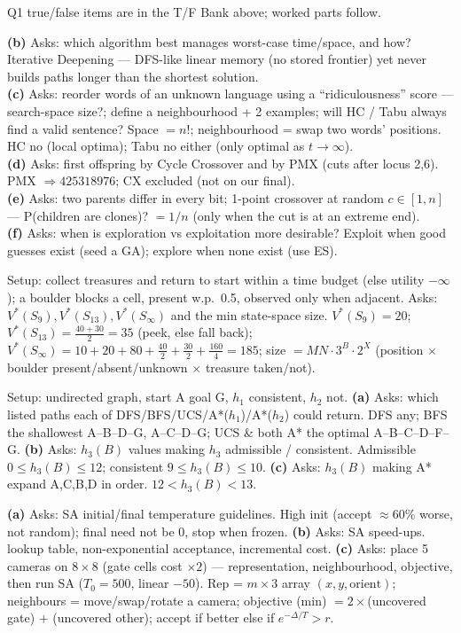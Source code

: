 Q1 true/false items are in the T/F Bank above; worked parts follow.

\textbf{(b)} Asks: which algorithm best manages worst-case time/space, and how? Iterative Deepening --- DFS-like linear memory (no stored frontier) yet never builds paths longer than the shortest solution.\\
\textbf{(c)} Asks: reorder words of an unknown language using a ``ridiculousness'' score --- search-space size?; define a neighbourhood + 2 examples; will HC / Tabu always find a valid sentence? Space \(=n!\); neighbourhood = swap two words' positions. HC no (local optima); Tabu no either (only optimal as \(t\to\infty\)).\\
\textbf{(d)} Asks: first offspring by Cycle Crossover and by PMX (cuts after locus 2,6). PMX \(\Rightarrow425318976\); CX excluded (not on our final).\\
\textbf{(e)} Asks: two parents differ in every bit; 1-point crossover at random \(c\in[1,n]\) --- P(children are clones)? \(=1/n\) (only when the cut is at an extreme end).\\
\textbf{(f)} Asks: when is exploration vs exploitation more desirable? Exploit when good guesses exist (seed a GA); explore when none exist (use ES).

Setup: collect treasures and return to start within a time budget (else utility \(-\infty\)); a boulder blocks a cell, present w.p.\ 0.5, observed only when adjacent. Asks: \(V^*(S_9),V^*(S_{13}),V^*(S_\infty)\) and the min state-space size. \(V^*(S_9)=20\); \(V^*(S_{13})=\tfrac{40+30}{2}=35\) (peek, else fall back); \(V^*(S_\infty)=10{+}20{+}80+\tfrac{40}{2}+\tfrac{30}{2}+\tfrac{160}{4}=185\); size \(=MN\cdot3^{B}\cdot2^{X}\) (position \(\times\) boulder present/absent/unknown \(\times\) treasure taken/not).

Setup: undirected graph, start A goal G, \(h_1\) consistent, \(h_2\) not. \textbf{(a)} Asks: which listed paths each of DFS/BFS/UCS/A*(\(h_1\))/A*(\(h_2\)) could return. DFS any; BFS the shallowest A--B--D--G, A--C--D--G; UCS \& both A* the optimal A--B--C--D--F--G. \textbf{(b)} Asks: \(h_3(B)\) values making \(h_3\) admissible / consistent. Admissible \(0\le h_3(B)\le12\); consistent \(9\le h_3(B)\le10\). \textbf{(c)} Asks: \(h_3(B)\) making A* expand A,C,B,D in order. \(12<h_3(B)<13\).

\textbf{(a)} Asks: SA initial/final temperature guidelines. High init (accept \(\approx\)60\% worse, not random); final need not be 0, stop when frozen. \textbf{(b)} Asks: SA speed-ups. lookup table, non-exponential acceptance, incremental cost. \textbf{(c)} Asks: place 5 cameras on \(8\times8\) (gate cells cost \(\times2\)) --- representation, neighbourhood, objective, then run SA (\(T_0{=}500\), linear \(-50\)). Rep = \(m\times3\) array \((x,y,\text{orient})\); neighbours = move/swap/rotate a camera; objective (min) \(=2\times\)(uncovered gate) \(+\) (uncovered other); accept if better else if \(e^{-\Delta/T}>r\).

